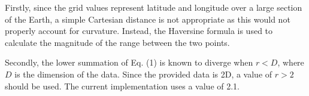 \documentclass{article}
\begin{document}
Firstly, since the grid values represent latitude and longitude over a large section 
of the Earth, a simple Cartesian distance is not appropriate as this would not 
properly account for curvature. Instead, the Haversine formula is used to calculate 
the magnitude of the range between the two points. 

Secondly, the lower summation of Eq. (1) is known to diverge when $r < D$, where $D$ 
is the dimension of the data. Since the provided data is 2D, a value of $r>2$ should 
be used. The current implementation uses a value of 2.1.
\end{document}
